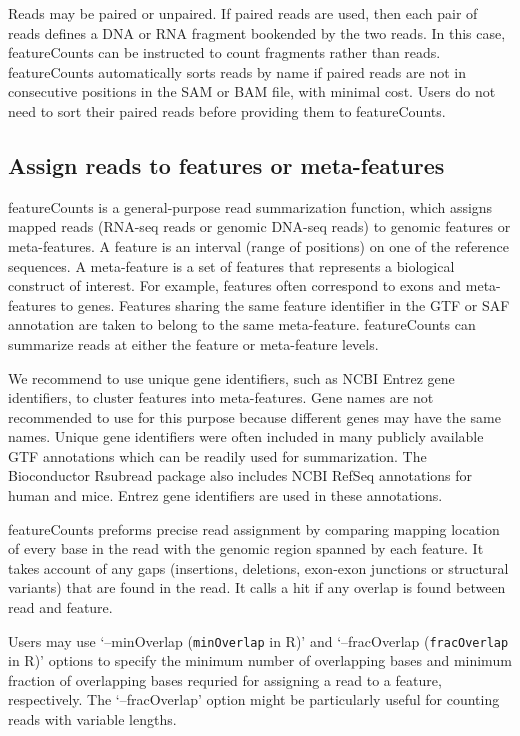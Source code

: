 \documentclass[12pt]{report}
\newcommand{\code}[1]{{\small\texttt{#1}}}
\newcommand{\Rsubread}{\textsf{Rsubread}}
\newcommand{\featureCounts}{\textsf{featureCounts}}
\newcommand{\R}{\textsf{R}}
\begin{document}
Reads may be paired or unpaired.
If paired reads are used, then each pair of reads defines a DNA or RNA fragment bookended by the two reads.
In this case, {\featureCounts} can be instructed to count fragments rather than reads.
{\featureCounts} automatically sorts reads by name if paired reads are not in consecutive positions in the SAM or BAM file, with minimal cost.
Users do not need to sort their paired reads before providing them to {\featureCounts}.

\subsection{Assign reads to features or meta-features}

{\featureCounts} is a general-purpose read summarization function, which assigns mapped reads (RNA-seq reads or genomic DNA-seq reads) to genomic features or meta-features.
A feature is an interval (range of positions) on one of the reference sequences.
A meta-feature is a set of features that represents a biological construct of interest.
For example, features often correspond to exons and meta-features to genes. Features sharing the same feature identifier in the GTF or SAF annotation are taken to belong to the same meta-feature. {\featureCounts} can summarize reads at either the feature or meta-feature levels.

We recommend to use unique gene identifiers, such as NCBI Entrez gene identifiers, to cluster features into meta-features. Gene names are not recommended to use for this purpose because different genes may have the same names. Unique gene identifiers were often included in many publicly available GTF annotations which can be readily used for summarization. The Bioconductor {\Rsubread} package also includes NCBI RefSeq annotations for human and mice. Entrez gene identifiers are used in these annotations.

{\featureCounts} preforms precise read assignment by comparing mapping location of every base in the read with the genomic region spanned by each feature.
It takes account of any gaps (insertions, deletions, exon-exon junctions or structural variants) that are found in the read.
It calls a hit if any overlap is found between read and feature.

Users may use `--minOverlap (\code{minOverlap} in \R)' and `--fracOverlap (\code{fracOverlap} in \R)' options to specify the minimum number of overlapping bases and minimum fraction of overlapping bases requried for assigning a read to a feature, respectively.
The `--fracOverlap' option might be particularly useful for counting reads with variable lengths.
\end{document}
